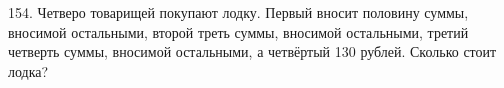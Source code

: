 154. Четверо товарищей покупают лодку. Первый вносит половину суммы, вносимой остальными, второй треть суммы, вносимой остальными, третий четверть суммы, вносимой остальными, а четвёртый 130 рублей. Сколько стоит лодка?\\
